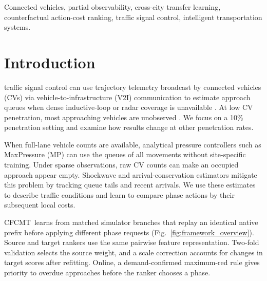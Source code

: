 \documentclass[letterpaper,journal]{IEEEtran}
\newcommand{\method}{CFCMT}
\begin{document}
\begin{IEEEkeywords}
Connected vehicles, partial observability, cross-city transfer learning, counterfactual action-cost ranking, traffic signal control, intelligent transportation systems.
\end{IEEEkeywords}

\section{Introduction}
\label{sec:intro}

 traffic signal control can use trajectory telemetry broadcast by connected vehicles (CVs) via vehicle-to-infrastructure (V2I) communication to estimate approach queues when dense inductive-loop or radar coverage is unavailable \cite{feng2015realtime,tiaprasert2015queue,zhao2022maximum}. At low CV penetration, most approaching vehicles are unobserved \cite{zhang2021partial,mo2022cvlight}. We focus on a 10\% penetration setting and examine how results change at other penetration rates.

When full-lane vehicle counts are available, analytical pressure controllers such as MaxPressure (MP) \cite{varaiya2013maxpressure} can use the queues of all movements without site-specific training. Under sparse observations, raw CV counts can make an occupied approach appear empty. Shockwave and arrival-conservation estimators \cite{liu2009realtime,tiaprasert2015queue} mitigate this problem by tracking queue tails and recent arrivals. We use these estimates to describe traffic conditions and learn to compare phase actions by their subsequent local costs.

\method\ learns from matched simulator branches that replay an identical native prefix before applying different phase requests (Fig.~\ref{fig:framework_overview}). Source and target rankers use the same pairwise feature representation. Two-fold validation selects the source weight, and a scale correction accounts for changes in target scores after refitting. Online, a demand-confirmed maximum-red rule gives priority to overdue approaches before the ranker chooses a phase.
\end{document}
